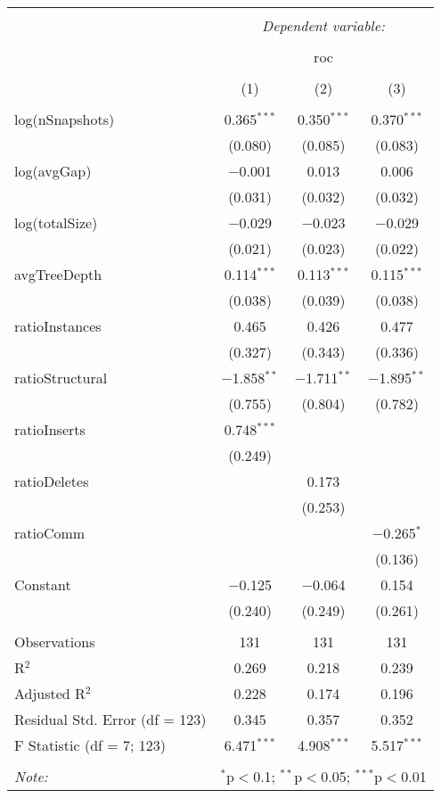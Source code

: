 \documentclass{report}
\begin{document}
\begin{table}[!htbp] \centering 
  \caption{} 
  \label{} 
\begin{tabular}{@{\extracolsep{5pt}}lccc} 
\\[-1.8ex]\hline 
\hline \\[-1.8ex] 
 & \multicolumn{3}{c}{\textit{Dependent variable:}} \\ 
\cline{2-4} 
\\[-1.8ex] & \multicolumn{3}{c}{roc} \\ 
\\[-1.8ex] & (1) & (2) & (3)\\ 
\hline \\[-1.8ex] 
 log(nSnapshots) & 0.365$^{***}$ & 0.350$^{***}$ & 0.370$^{***}$ \\ 
  & (0.080) & (0.085) & (0.083) \\ 
  log(avgGap) & $-$0.001 & 0.013 & 0.006 \\ 
  & (0.031) & (0.032) & (0.032) \\ 
  log(totalSize) & $-$0.029 & $-$0.023 & $-$0.029 \\ 
  & (0.021) & (0.023) & (0.022) \\ 
  avgTreeDepth & 0.114$^{***}$ & 0.113$^{***}$ & 0.115$^{***}$ \\ 
  & (0.038) & (0.039) & (0.038) \\ 
  ratioInstances & 0.465 & 0.426 & 0.477 \\ 
  & (0.327) & (0.343) & (0.336) \\ 
  ratioStructural & $-$1.858$^{**}$ & $-$1.711$^{**}$ & $-$1.895$^{**}$ \\ 
  & (0.755) & (0.804) & (0.782) \\ 
  ratioInserts & 0.748$^{***}$ &  &  \\ 
  & (0.249) &  &  \\ 
  ratioDeletes &  & 0.173 &  \\ 
  &  & (0.253) &  \\ 
  ratioComm &  &  & $-$0.265$^{*}$ \\ 
  &  &  & (0.136) \\ 
  Constant & $-$0.125 & $-$0.064 & 0.154 \\ 
  & (0.240) & (0.249) & (0.261) \\ 
 \hline \\[-1.8ex] 
Observations & 131 & 131 & 131 \\ 
R$^{2}$ & 0.269 & 0.218 & 0.239 \\ 
Adjusted R$^{2}$ & 0.228 & 0.174 & 0.196 \\ 
Residual Std. Error (df = 123) & 0.345 & 0.357 & 0.352 \\ 
F Statistic (df = 7; 123) & 6.471$^{***}$ & 4.908$^{***}$ & 5.517$^{***}$ \\ 
\hline 
\hline \\[-1.8ex] 
\textit{Note:}  & \multicolumn{3}{r}{$^{*}$p$<$0.1; $^{**}$p$<$0.05; $^{***}$p$<$0.01} \\ 
\end{tabular} 
\end{table} 
\end{document}
